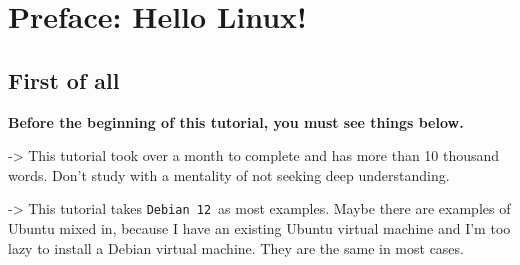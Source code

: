 \documentclass[12pt]{ctexart}
\begin{document}
\begin{titlepage}
    \centering
    \vspace*{96pt}
    \fontsize{26}{31.2}\selectfont{Introdution to Linux}\par %
    \vspace{39pt}
    \fontsize{22}{26.4}\selectfont{\haettenfont v2. 1\normalfont}\par %
    \vspace{52.8pt}
    \fontsize{18}{21.6}\par %
    \fontsize{18}{21.6}\selectfont{Last Edited on: Mar 1st, 2025}\par %
    \vfill
\end{titlepage}

\newpage
\thispagestyle{empty}
\small
\tableofcontents
\newpage
\setcounter{page}{1}

\fancyhf{}
\fancyhead[C]{ }
\fancyfoot[C]{\bfseries\thepage}

\newpage
\titleformat{\section}[block]{\normalfont\Large\bfseries\centering}{}{0pt}{}
\section*{\textbf{Preface: Hello Linux!}}

\subsection*{\textbf{First of all}}
\textbf{Before the beginning of this tutorial, you must see things
below.}

-> This tutorial took over a month to complete and has more than 10
thousand words. Don't study with a mentality of not
seeking deep understanding.

-> This tutorial takes \texttt{Debian\ 12}\ as most examples. Maybe there
are examples of Ubuntu mixed in, because I have an existing Ubuntu
virtual machine and I'm too lazy to install a Debian
virtual machine. They are the same in most cases.
\end{document}
